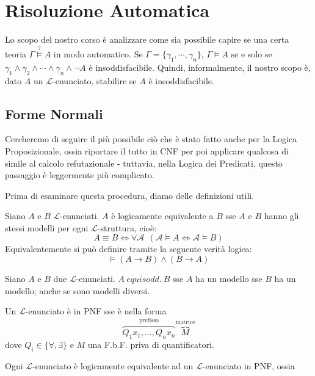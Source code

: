 \chapter{Risoluzione Automatica}
Lo scopo del nostro corso è analizzare come sia possibile capire se una certa 
teoria $\Gamma \stackrel ? \models A$ in modo automatico. 
Se $\Gamma = \{\gamma_1, \cdots, \gamma_n\}$, $\Gamma \models A$ se e solo se 
$\gamma_1 \land \gamma_2 \land \cdots \land \gamma_n \land \neg A$ è insoddisfacibile. 
Quindi, informalmente, il nostro scopo è, dato $A$ un $\mathscr{L}$-enunciato, stabilire se $A$ 
è insoddisfacibile. 


\section{Forme Normali}
Cercheremo di seguire il più possibile ciò che è stato fatto anche per la Logica 
Proposizionale, ossia riportare il tutto in CNF per poi applicare qualcosa 
di simile al calcolo refutazionale - tuttavia, nella Logica dei Predicati, 
questo passaggio è leggermente più complicato. 

Prima di esaminare questa procedura, diamo delle definizioni utili. 
\begin{defi}
Siano $A$ e  $B$ $\mathscr{L}$-enunciati. $A$ è logicamente equivalente a $B$ sse $A$ e $B$ hanno gli stessi modelli per ogni $\mathscr{L}$-struttura, cioè:
$$
A \equiv B \iff \forall \mathscr{A} ~~ (\mathscr{A} \models A \iff \mathscr{A} \models B)
$$
Equivalentemente si può definire tramite la seguente verità logica: 
$$
\models (A \rightarrow B) \land (B \rightarrow A) 
$$
\end{defi}

\begin{defi}[Equisoddisfacibilità]
Siano $A$ e $B$ due $\mathscr{L}$-enunciati. $A\ equisodd.\ B$ sse  $A$ ha un modello sse $B$ ha un modello; anche se sono modelli diversi. 
\end{defi}

\begin{defi}
Un $\mathscr{L}$-enunciato è in PNF sse è nella forma 
\[
\overbrace{Q_1 x_1, \ldots, Q_n x_n}^{\text{prefisso}} \overbrace{M}^{\text{matrice}}
\]
dove $Q_i \in \{ \forall, \exists\}$ e $M$ una F.b.F. priva di quantificatori. 

\end{defi}
Ogni $\mathscr{L}$-enunciato è logicamente equivalente ad un $\mathscr{L}$-enunciato in PNF, 
ossia 

